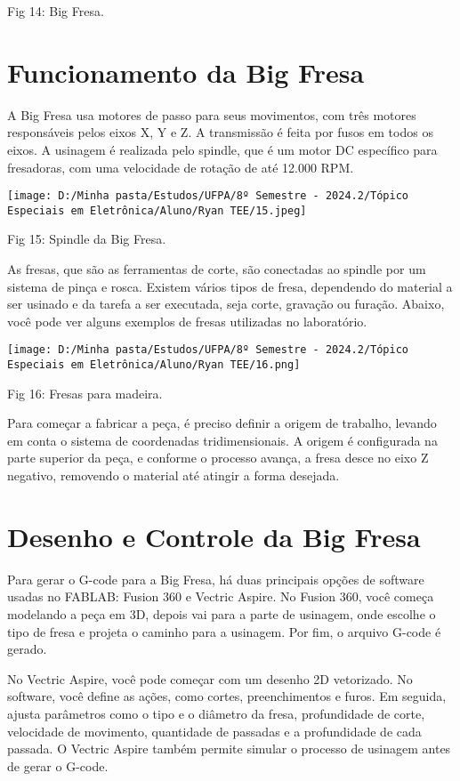 \documentclass[
]{book}
\begin{document}
Fig 14: Big Fresa.

\section{Funcionamento da Big Fresa}\label{funcionamento-da-big-fresa}

A Big Fresa usa motores de passo para seus movimentos, com três motores responsáveis pelos eixos X, Y e Z. A transmissão é feita por fusos em todos os eixos. A usinagem é realizada pelo spindle, que é um motor DC específico para fresadoras, com uma velocidade de rotação de até 12.000 RPM.

\texttt{[image: D:/Minha pasta/Estudos/UFPA/8º Semestre - 2024.2/Tópico Especiais em Eletrônica/Aluno/Ryan TEE/15.jpeg]}

Fig 15: Spindle da Big Fresa.

As fresas, que são as ferramentas de corte, são conectadas ao spindle por um sistema de pinça e rosca. Existem vários tipos de fresa, dependendo do material a ser usinado e da tarefa a ser executada, seja corte, gravação ou furação. Abaixo, você pode ver alguns exemplos de fresas utilizadas no laboratório.

\texttt{[image: D:/Minha pasta/Estudos/UFPA/8º Semestre - 2024.2/Tópico Especiais em Eletrônica/Aluno/Ryan TEE/16.png]}

Fig 16: Fresas para madeira.

Para começar a fabricar a peça, é preciso definir a origem de trabalho, levando em conta o sistema de coordenadas tridimensionais. A origem é configurada na parte superior da peça, e conforme o processo avança, a fresa desce no eixo Z negativo, removendo o material até atingir a forma desejada.

\section{Desenho e Controle da Big Fresa}\label{desenho-e-controle-da-big-fresa}

Para gerar o G-code para a Big Fresa, há duas principais opções de software usadas no FABLAB: Fusion 360 e Vectric Aspire. No Fusion 360, você começa modelando a peça em 3D, depois vai para a parte de usinagem, onde escolhe o tipo de fresa e projeta o caminho para a usinagem. Por fim, o arquivo G-code é gerado.

No Vectric Aspire, você pode começar com um desenho 2D vetorizado. No software, você define as ações, como cortes, preenchimentos e furos. Em seguida, ajusta parâmetros como o tipo e o diâmetro da fresa, profundidade de corte, velocidade de movimento, quantidade de passadas e a profundidade de cada passada. O Vectric Aspire também permite simular o processo de usinagem antes de gerar o G-code.
\end{document}
